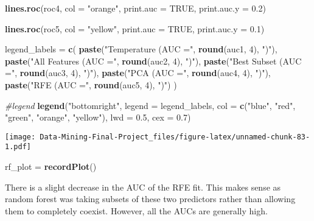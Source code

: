 \documentclass[
]{article}
\newenvironment{Shaded}{\begin{snugshade}}{\end{snugshade}}
\newcommand{\AttributeTok}[1]{\textcolor[rgb]{0.13,0.29,0.53}{#1}}
\newcommand{\CommentTok}[1]{\textcolor[rgb]{0.56,0.35,0.01}{\textit{#1}}}
\newcommand{\ConstantTok}[1]{\textcolor[rgb]{0.56,0.35,0.01}{#1}}
\newcommand{\DecValTok}[1]{\textcolor[rgb]{0.00,0.00,0.81}{#1}}
\newcommand{\FloatTok}[1]{\textcolor[rgb]{0.00,0.00,0.81}{#1}}
\newcommand{\FunctionTok}[1]{\textcolor[rgb]{0.13,0.29,0.53}{\textbf{#1}}}
\newcommand{\NormalTok}[1]{#1}
\newcommand{\OtherTok}[1]{\textcolor[rgb]{0.56,0.35,0.01}{#1}}
\newcommand{\StringTok}[1]{\textcolor[rgb]{0.31,0.60,0.02}{#1}}
\begin{document}
\begin{Shaded}
\begin{Highlighting}[]
\FunctionTok{lines.roc}\NormalTok{(roc4, }\AttributeTok{col =} \StringTok{"orange"}\NormalTok{, }\AttributeTok{print.auc =} \ConstantTok{TRUE}\NormalTok{, }\AttributeTok{print.auc.y =} \FloatTok{0.2}\NormalTok{)}

\FunctionTok{lines.roc}\NormalTok{(roc5, }\AttributeTok{col =} \StringTok{"yellow"}\NormalTok{, }\AttributeTok{print.auc =} \ConstantTok{TRUE}\NormalTok{, }\AttributeTok{print.auc.y =} \FloatTok{0.1}\NormalTok{)}

\NormalTok{legend\_labels }\OtherTok{=} \FunctionTok{c}\NormalTok{(}
  \FunctionTok{paste}\NormalTok{(}\StringTok{"Temperature (AUC ="}\NormalTok{, }\FunctionTok{round}\NormalTok{(auc1, }\DecValTok{4}\NormalTok{), }\StringTok{")"}\NormalTok{),}
  \FunctionTok{paste}\NormalTok{(}\StringTok{"All Features (AUC ="}\NormalTok{, }\FunctionTok{round}\NormalTok{(auc2, }\DecValTok{4}\NormalTok{), }\StringTok{")"}\NormalTok{),}
  \FunctionTok{paste}\NormalTok{(}\StringTok{"Best Subset (AUC ="}\NormalTok{, }\FunctionTok{round}\NormalTok{(auc3, }\DecValTok{4}\NormalTok{), }\StringTok{")"}\NormalTok{),}
  \FunctionTok{paste}\NormalTok{(}\StringTok{"PCA (AUC ="}\NormalTok{, }\FunctionTok{round}\NormalTok{(auc4, }\DecValTok{4}\NormalTok{), }\StringTok{")"}\NormalTok{),}
  \FunctionTok{paste}\NormalTok{(}\StringTok{"RFE (AUC ="}\NormalTok{, }\FunctionTok{round}\NormalTok{(auc5, }\DecValTok{4}\NormalTok{), }\StringTok{")"}\NormalTok{)}
\NormalTok{)}

\CommentTok{\#legend}
\FunctionTok{legend}\NormalTok{(}\StringTok{"bottomright"}\NormalTok{, }\AttributeTok{legend =}\NormalTok{ legend\_labels, }\AttributeTok{col =} \FunctionTok{c}\NormalTok{(}\StringTok{"blue"}\NormalTok{, }\StringTok{"red"}\NormalTok{, }\StringTok{"green"}\NormalTok{, }\StringTok{"orange"}\NormalTok{, }\StringTok{"yellow"}\NormalTok{), }\AttributeTok{lwd =} \FloatTok{0.5}\NormalTok{, }\AttributeTok{cex =} \FloatTok{0.7}\NormalTok{)}
\end{Highlighting}
\end{Shaded}

\texttt{[image: Data-Mining-Final-Project\_files/figure-latex/unnamed-chunk-83-1.pdf]}

\begin{Shaded}
\begin{Highlighting}[]
\NormalTok{rf\_plot }\OtherTok{=} \FunctionTok{recordPlot}\NormalTok{()}
\end{Highlighting}
\end{Shaded}

There is a slight decrease in the AUC of the RFE fit. This makes sense
as random forest was taking subsets of these two predictors rather than
allowing them to completely coexist. However, all the AUCs are generally
high.
\end{document}
